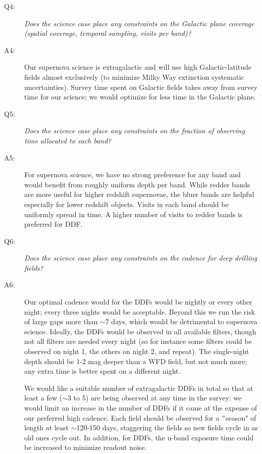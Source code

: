 \begin{description}
\item[Q4:] {\it Does the science case place any constraints on the
Galactic plane coverage (spatial coverage, temporal sampling, visits per
band)?}

\item[A4:] Our supernova science is extragalactic and will use high Galactic-latitude
fields almost exclusively (to minimize Milky Way extinction systematic
uncertainties). Survey time spent on Galactic fields takes away from survey
time for our science; we would optimize for less time in the Galactic
plane.

\item[Q5:] {\it Does the science case place any constraints on the
fraction of observing time allocated to each band?}


\item[A5:] For supernova science, we have no strong preference for any band and would
benefit from roughly uniform depth per band. While redder bands are more
useful for higher redshift supernovae, the bluer bands are helpful
especially for lower redshift objects. Visits in each band should be
uniformly spread in time. A higher number of visits to redder bands is
preferred for DDF.

\item[Q6:] {\it Does the science case place any constraints on the
cadence for deep drilling fields?}


\item[A6:] Our optimal cadence would for the DDFs would be nightly or every other
night; every three nights would be acceptable. Beyond this we run the risk
of large gaps more than $\sim$7 days, which would be detrimental to supernova
science. Ideally, the DDFs would be observed in all available filters,
though not all filters are needed every night (so for instance some filters
could be observed on night 1, the others on night 2, and repeat). The
single-night depth should be 1-2 mag deeper than a WFD field, but not much
more; any extra time is better spent on a different night.

We would like a suitable number of extragalactic DDFs in total so that at
least a few ($\sim$3 to 5) are being observed at any time in the survey: we
would limit an increase in the number of DDFs if it came at the expense of
our preferred high cadence. Each field should be observed for a $``$season" of
length at least $\sim$120-150 days, staggering the fields so new fields cycle in
as old ones cycle out. In addition, for DDFs, the u-band exposure time
could be increased to minimize readout noise.


\end{description}
